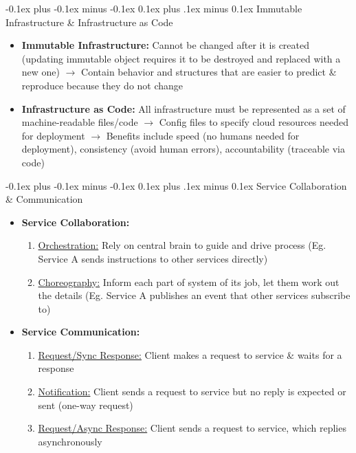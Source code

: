 \documentclass[landscape]{article}
\makeatletter
\renewcommand{\subsection}{\@startsection{subsection}{2}{0mm}%
  {-0.1ex plus -0.1ex minus -0.1ex}%
  {0.1ex plus .1ex minus 0.1ex}%
{\normalfont\scriptsize\bfseries}}
\makeatother
\begin{document}
\begin{multicols*}{5}
    \subsection{Immutable Infrastructure \& Infrastructure as Code}
    \begin{itemize}
      \item \textbf{Immutable Infrastructure:} Cannot be changed after it is created (updating immutable object requires it to be destroyed and replaced with a new one) $\rightarrow$ Contain behavior and structures that are easier to predict \& reproduce because they do not change
      \item \textbf{Infrastructure as Code:} All infrastructure must be represented as a set of machine-readable files/code $\rightarrow$ Config files to specify cloud resources needed for deployment $\rightarrow$ Benefits include speed (no humans needed for deployment), consistency (avoid human errors), accountability (traceable via code)
    \end{itemize}
    
    \subsection{Service Collaboration \& Communication}
    \begin{itemize}
      \item \textbf{Service Collaboration:}
      \begin{enumerate}
        \item \underline{Orchestration:} Rely on central brain to guide and drive process (Eg. Service A sends instructions to other services directly)
        \item \underline{Choreography:} Inform each part of system of its job, let them work out the details (Eg. Service A publishes an event that other services subscribe to)
      \end{enumerate} 
      \item \textbf{Service Communication:}
      \begin{enumerate}
        \item \underline{Request/Sync Response:} Client makes a request to service \& waits for a response
        \item \underline{Notification:} Client sends a request to service but no reply is expected or sent (one-way request)
        \item \underline{Request/Async Response:} Client sends a request to service, which replies asynchronously
      \end{enumerate}
    \end{itemize}


\end{multicols*}
\end{document}
